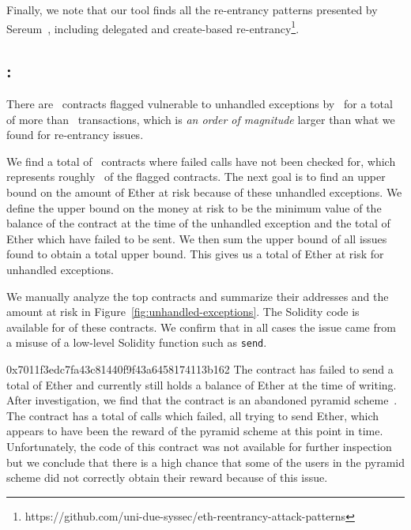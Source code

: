 Finally, we note that our tool finds all the re-entrancy patterns presented by Sereum~\cite{Rodler2019}, including delegated and create-based re-entrancy\footnote{https://github.com/uni-due-syssec/eth-reentrancy-attack-patterns}.



\subsection{\vue: \unhandledexceptions}
\label{ssec:analysis-ue}
There are~ contracts flagged vulnerable to unhandled exceptions by~\cite{Tsankov2018,Luu2016a,DBLP:conf/ndss/KalraGDS18} for a total of more than~ transactions, which is \emph{an order of magnitude} larger than what we found for re-entrancy issues.

We find a total of~ contracts where failed calls have not been checked for, which represents roughly~ of the flagged contracts. The next goal is to find an upper bound on the amount of Ether at risk because of these unhandled exceptions. We define the upper bound on the money at risk to be the minimum value of the balance of the contract at the time of the unhandled exception and the total of Ether which have failed to be sent. We then sum the upper bound of all issues found to obtain a total upper bound. This gives us a total of  Ether at risk for unhandled exceptions.

We manually analyze the top contracts and summarize their addresses and the amount at risk in Figure~\ref{fig:unhandled-exceptions}. The Solidity code is available for  of these contracts. We confirm that in all cases the issue came from a misuse of a low-level Solidity function such as \lstinline{send}.

\begin{investigation}{0x7011f3edc7fa43c81440f9f43a6458174113b162}
The contract {\small{}} has failed to send a total of  Ether and currently still holds a balance of  Ether at the time of writing. After investigation, we find that the contract is an abandoned pyramid scheme~\cite{ethereum-pyramid}. The contract has a total of  calls which failed, all trying to send  Ether, which appears to have been the reward of the pyramid scheme at this point in time. Unfortunately, the code of this contract was not available for further inspection but we conclude that there is a high chance that some of the users in the pyramid scheme did not correctly obtain their reward because of this issue.
\end{investigation}


